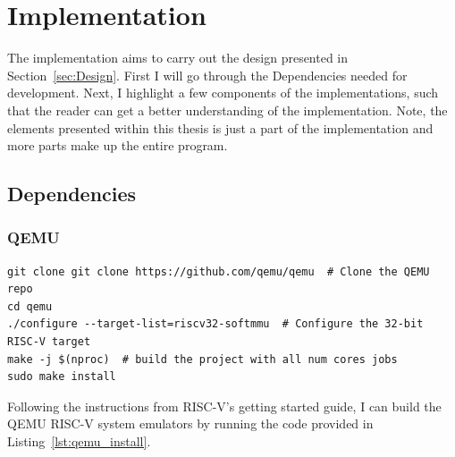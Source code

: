\section{Implementation}
The implementation aims to carry out the design presented in
Section~\ref{sec:Design}. First I will go through the Dependencies needed for
development. Next, I highlight a few components of the implementations, such
that the reader can get a better understanding of the implementation. Note, the
elements presented within this thesis is just a part of the implementation and
more parts make up the entire program.

\subsection{Dependencies}
\subsubsection*{QEMU}
\begin{lstlisting}[caption=Installing QEMU, label=lst:qemu_install, float=h]
git clone git clone https://github.com/qemu/qemu  # Clone the QEMU repo
cd qemu
./configure --target-list=riscv32-softmmu  # Configure the 32-bit RISC-V target
make -j $(nproc)  # build the project with all num cores jobs
sudo make install
\end{lstlisting}
Following the instructions from RISC-V's getting started guide, I can build the
QEMU RISC-V system emulators by running the code provided in
Listing~\ref{lst:qemu_install}\cite{RISC-V_GS}.

